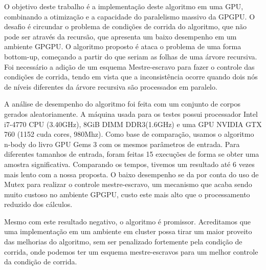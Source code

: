\documentclass[12pt]{article}
\begin{document}
O objetivo deste trabalho é a implementação deste algoritmo em uma GPU, combinando a otimização e a capacidade do paralelismo massivo da GPGPU. O desafio é circundar o problema de condições de corrida do algoritmo, que não pode ser através da recursão, que apresenta um baixo desempenho em um ambiente GPGPU. O algoritmo proposto é ataca o problema de uma forma bottom-up, começando a partir do que seriam as folhas de uma árvore recursiva. Foi necessário a adição de um esquema Mestre-escravo para fazer o controle das condições de corrida, tendo em vista que a inconsistência ocorre quando dois nós de níveis diferentes da árvore recursiva são processados em paralelo.

A análise de desempenho do algoritmo foi feita com um conjunto de corpos gerados aleatoriamente. A máquina
usada para os testes possui processador Intel i7-4770 CPU (3.40GHz),
8GiB DIMM DDR3(1.6GHz) e uma GPU NVIDIA GTX 760 (1152 cuda cores, 980Mhz). Como base de comparação, usamos o algoritmo n-body do livro GPU Gems 3 com os mesmos parâmetros de entrada. Para diferentes tamanhos de entrada, foram feitas 15 execuções de forma se obter uma amostra significativa. Comparando os tempos, tivemos um resultado até 6 vezes mais lento com a nossa proposta. O baixo desempenho se da por conta do uso de Mutex para realizar o controle mestre-escravo, um mecanismo que acaba sendo muito custoso no ambiente GPGPU, custo este mais alto que o processamento reduzido dos cálculos.  

Mesmo com este resultado negativo, o algoritmo é promissor. Acreditamos que uma implementação em um ambiente em cluster possa tirar um maior proveito das melhorias do algoritmo, sem ser penalizado fortemente pela condição de corrida, onde podemos ter um esquema mestre-escravos para um melhor controle da condição de corrida.


\medskip
%
\end{document}
